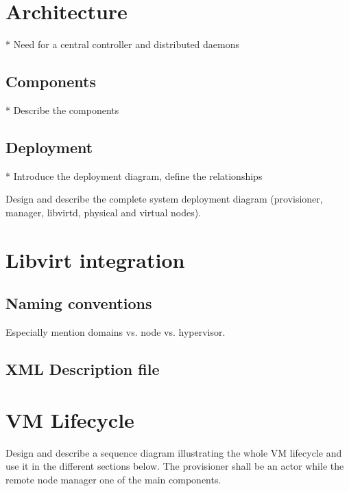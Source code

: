 \section{Architecture}
\label{sec:cluster-arch}

* Need for a central controller and distributed daemons

\subsection{Components}

* Describe the components

\subsection{Deployment}

* Introduce the deployment diagram, define the relationships

\begin{todo}
Design and describe the complete system deployment diagram (provisioner, manager, libvirtd, physical and virtual nodes).
\end{todo}


\section{Libvirt integration}
\label{sec:libvirt-integration}

\subsection{Naming conventions}

\begin{todo}
Especially mention domains vs. node vs. hypervisor.
\end{todo}

\subsection{XML Description file}


\section{VM Lifecycle}
\label{sec:vm-lifecycle}

\begin{todo}
Design and describe a sequence diagram illustrating the whole VM lifecycle and use it in the different sections below. The provisioner shall be an actor while the remote node manager one of the main components.
\end{todo}

